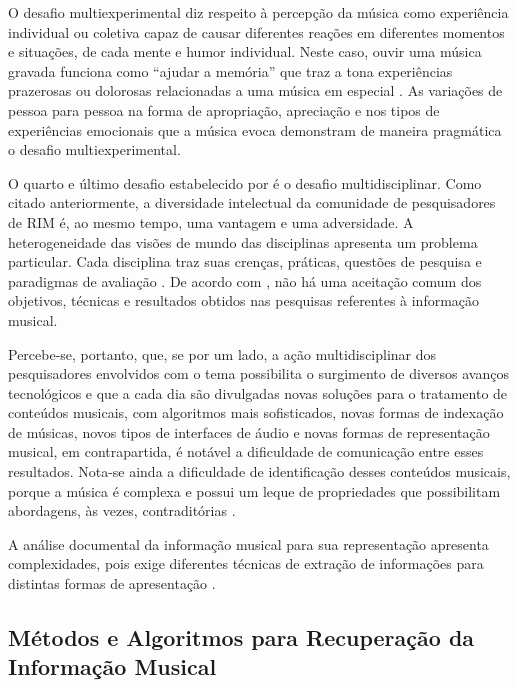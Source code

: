 O desafio multiexperimental diz respeito à percepção da música como experiência individual ou coletiva capaz de causar diferentes reações em diferentes momentos e situações, de cada mente e humor individual. Neste caso, ouvir uma música gravada funciona como “ajudar a memória” que traz a tona experiências prazerosas ou dolorosas relacionadas a uma música em especial \cite{downie2003,santini&souza2007}. As variações de pessoa para pessoa na forma de apropriação, apreciação e nos tipos de experiências emocionais que a música evoca demonstram de maneira pragmática o desafio multiexperimental.

O quarto e último desafio estabelecido por  é o desafio multidisciplinar. Como citado anteriormente, a diversidade intelectual da comunidade de pesquisadores de RIM é, ao mesmo tempo, uma vantagem e uma adversidade. A heterogeneidade das visões de mundo das disciplinas apresenta um problema particular. Cada disciplina traz suas crenças, práticas, questões de pesquisa e paradigmas de avaliação \cite{downie2003}. De acordo com , não há uma aceitação comum dos objetivos, técnicas e resultados obtidos nas pesquisas referentes à informação musical.

Percebe-se, portanto, que, se por um lado, a ação multidisciplinar dos pesquisadores envolvidos com o tema possibilita o surgimento de diversos avanços tecnológicos e que a cada dia são divulgadas novas soluções para o tratamento de conteúdos musicais, com algoritmos mais sofisticados, novas formas de indexação de músicas, novos tipos de interfaces de áudio e novas formas de representação musical, em contrapartida, é notável a dificuldade de comunicação entre esses resultados. Nota-se ainda a dificuldade de identificação desses conteúdos musicais, porque a música é complexa e possui um leque de propriedades que possibilitam abordagens, às vezes, contraditórias \cite{cruz2014}.

A análise documental da informação musical para sua representação apresenta complexidades, pois exige diferentes técnicas de extração de informações para distintas formas de apresentação \cite{downie2003}.

\subsection{Métodos e Algoritmos para Recuperação da Informação Musical}

